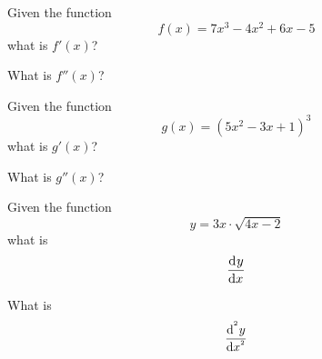 
\begin{ProblemSet}
 \begin{Problem}
  Given the function
  \begin{equation*}
   f(x) = 7 x^3 - 4 x^2 + 6x - 5
  \end{equation*}
  what is $f'(x)$?
 \end{Problem}
 \begin{Problem}
  What is $f''(x)$?
 \end{Problem}
\end{ProblemSet}

\begin{ProblemSet}
 \begin{Problem}
  Given the function
  \begin{equation*}
   g(x) = \left(5x^2 - 3x + 1\right)^3
  \end{equation*}
  what is $g'(x)$?
 \end{Problem}
 \begin{Problem}
  What is $g''(x)$?
 \end{Problem}
\end{ProblemSet}

\newpage

\begin{ProblemSet}[pencil space=2in]
 \begin{Problem}
  Given the function
  \begin{equation*}
   y = 3x \cdot \sqrt{4x - 2}
  \end{equation*}
  what is
  \begin{equation*}
   \Deriv{y}{x}
  \end{equation*}
 \end{Problem}
 \begin{Problem}
  What is
  \begin{equation*}
   \Deriv[^2]{y}{x}
  \end{equation*}
 \end{Problem}
\end{ProblemSet}

